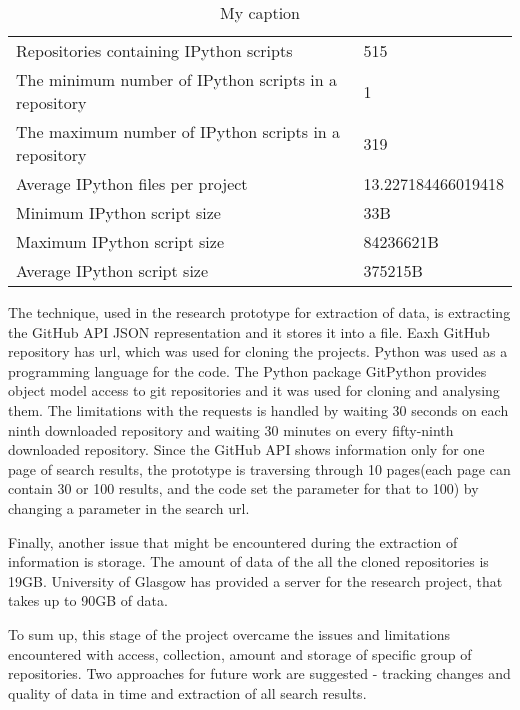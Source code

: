 \begin{table*}[]
\centering
\begin{tabular}{ll}
Repositories containing IPython scripts               & 515                \\
The minimum number of IPython scripts in a repository & 1                  \\
The maximum number of IPython scripts in a repository & 319                \\
Average IPython files per project                     & 13.227184466019418 \\
Minimum IPython script size                           & 33B                \\
Maximum IPython script size                           & 84236621B          \\
Average IPython script size                           & 375215B           
\end{tabular}
\caption{My caption}
\label{my-label}
\end{table*}

The technique, used in the research prototype for extraction of data, is extracting the GitHub API JSON representation and it stores it into a file. Eaxh GitHub repository has url, which was used for cloning the projects. Python was used as a programming language for the code. The Python package GitPython\cite{GitPython} provides object model access to git repositories and it was used for cloning and analysing them. The limitations with the requests is handled by waiting 30 seconds on each ninth downloaded repository and waiting 30 minutes on every fifty-ninth downloaded repository. Since the GitHub API shows information only for one page of search results, the prototype is traversing through 10 pages(each page can contain 30 or 100 results, and the code set the parameter for that to 100) by changing a parameter in the search url. 

Finally, another issue that might be encountered during the extraction of information is storage. The amount of data of the all the cloned repositories is 19GB. University of Glasgow has provided a server for the research project, that takes up to 90GB of data. 

To sum up, this stage of the project overcame the issues and limitations encountered with access, collection, amount and storage of specific group of repositories. Two approaches for future work are suggested - tracking changes and quality of data in time and extraction of all search results.

